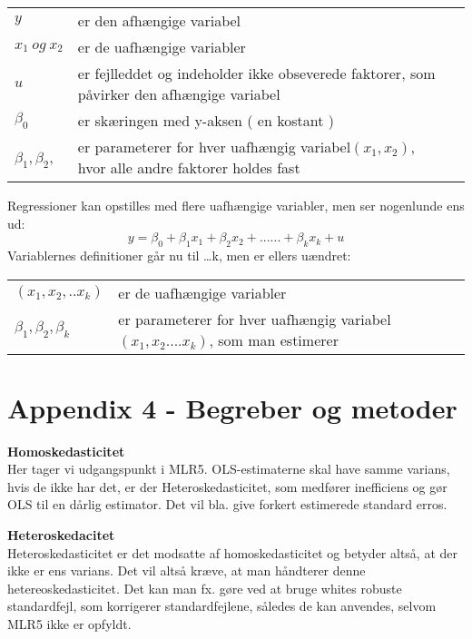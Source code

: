 \documentclass[
  10pt,
]{article}
\begin{document}
\begin{tabular}{lll}
        $y$ & er den afhængige variabel \\
        $x_1 \ og \ x_2 $ & er de uafhængige variabler  \\
        $u$ & er fejlleddet og indeholder ikke obseverede faktorer, som påvirker den afhængige variabel \\
        $\beta_0$ & er skæringen med y-aksen ( en kostant ) \\
        $\beta_1, \beta_2$, &  er parameterer for hver uafhængig variabel$(x_1,x_2)$, hvor alle andre faktorer holdes fast
      
\end{tabular}
\endgroup 
\newline
\newline
\newline

Regressioner kan opstilles med flere uafhængige variabler, men ser
nogenlunde ens ud: \[
y = \beta_0+\beta_1 x_1 + \beta_2 x_2 + ......+\beta_k x_k + u
\] Variablernes definitioner går nu til \ldots k, men er ellers uændret:
\begingroup \setlength{\tabcolsep}{2pt}

\renewcommand{\arraystretch}{0.5}
\begin{tabular}{lll}
        $(x_1,x_2,..x_k)$ & er de uafhængige variabler  \\
        $\beta_1, \beta_2, \beta_k$ &  er parameterer for hver uafhængig variabel$(x_1,x_2....x_k)$, som man estimerer
      
\end{tabular}
\endgroup
\newpage

\section{Appendix 4 - Begreber og metoder}
\label{sec:Begreber og metoder}

\textbf{Homoskedasticitet}\\
Her tager vi udgangspunkt i MLR5. OLS-estimaterne skal have samme
varians, hvis de ikke har det, er der Heteroskedasticitet, som medfører
inefficiens og gør OLS til en dårlig estimator. Det vil bla. give
forkert estimerede standard erros. \newline

\textbf{Heteroskedacitet}\\
Heteroskedasticitet er det modsatte af homoskedasticitet og betyder
altså, at der ikke er ens varians. Det vil altså kræve, at man håndterer
denne hetereoskedasticitet. Det kan man fx. gøre ved at bruge whites
robuste standardfejl, som korrigerer standardfejlene, således de kan
anvendes, selvom MLR5 ikke er opfyldt. \newline
\end{document}
